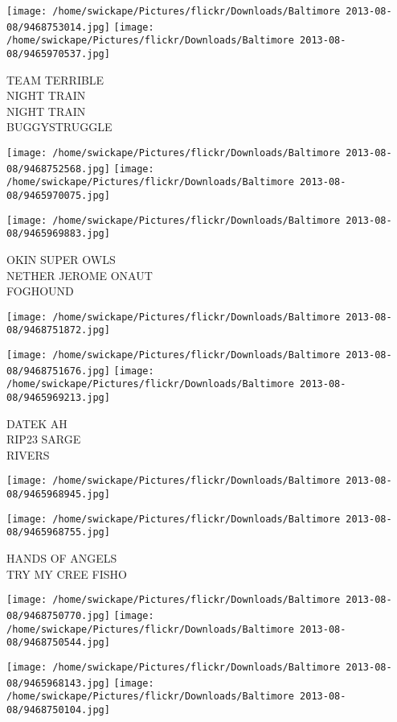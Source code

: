 \documentclass[10pt,letterpaper]{article}
\begin{document}
\texttt{[image: /home/swickape/Pictures/flickr/Downloads/Baltimore 2013-08-08/9468753014.jpg]}
\texttt{[image: /home/swickape/Pictures/flickr/Downloads/Baltimore 2013-08-08/9465970537.jpg]}

TEAM TERRIBLE\\
NIGHT TRAIN\\
NIGHT TRAIN\\
BUGGYSTRUGGLE
\pagebreak

\texttt{[image: /home/swickape/Pictures/flickr/Downloads/Baltimore 2013-08-08/9468752568.jpg]}
\texttt{[image: /home/swickape/Pictures/flickr/Downloads/Baltimore 2013-08-08/9465970075.jpg]}

\texttt{[image: /home/swickape/Pictures/flickr/Downloads/Baltimore 2013-08-08/9465969883.jpg]}

OKIN SUPER OWLS\\
NETHER JEROME ONAUT\\
FOGHOUND
\pagebreak

\texttt{[image: /home/swickape/Pictures/flickr/Downloads/Baltimore 2013-08-08/9468751872.jpg]}

\vspace{0.25in}
\texttt{[image: /home/swickape/Pictures/flickr/Downloads/Baltimore 2013-08-08/9468751676.jpg]}
\texttt{[image: /home/swickape/Pictures/flickr/Downloads/Baltimore 2013-08-08/9465969213.jpg]}

DATEK AH\\
RIP23 SARGE\\
RIVERS
\pagebreak

\texttt{[image: /home/swickape/Pictures/flickr/Downloads/Baltimore 2013-08-08/9465968945.jpg]}

\vspace{0.25in}
\texttt{[image: /home/swickape/Pictures/flickr/Downloads/Baltimore 2013-08-08/9465968755.jpg]}

HANDS OF ANGELS\\
TRY MY CREE FISHO
\pagebreak

\texttt{[image: /home/swickape/Pictures/flickr/Downloads/Baltimore 2013-08-08/9468750770.jpg]}
\texttt{[image: /home/swickape/Pictures/flickr/Downloads/Baltimore 2013-08-08/9468750544.jpg]}

\texttt{[image: /home/swickape/Pictures/flickr/Downloads/Baltimore 2013-08-08/9465968143.jpg]}
\texttt{[image: /home/swickape/Pictures/flickr/Downloads/Baltimore 2013-08-08/9468750104.jpg]}
\end{document}
